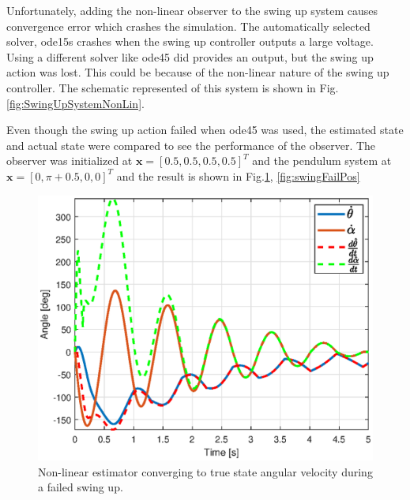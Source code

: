 \documentclass[superscriptaddress,floatfix,reprint,amssymb, amsmath,aps, pre]{revtex4-1}
\newcommand{\bx}{\textbf{x}}
\begin{document}
{{{            Unfortunately, adding the non-linear observer to the swing up system causes convergence error which crashes the simulation. The automatically selected solver, ode15s crashes when the swing up controller outputs a large voltage. Using a different solver like ode45 did provides an output, but the swing up action was lost. This could be because of the non-linear nature of the swing up controller. The schematic represented of this system is shown in Fig.\ref{fig:SwingUpSystemNonLin}.

            Even though the swing up action failed when ode45 was used, the estimated state and actual state were compared to see the performance of the observer. The observer was initialized at \(\bx = [0.5,0.5,0.5,0.5]^T\) and the pendulum system at \(\bx = [0,\pi + 0.5,0,0]^T\) and the result is shown in Fig.\ref{fig:SwingupfailVel}, \ref{fig:swingFailPos}

            \begin{figure}
                \includegraphics[width = \linewidth]{SwingupfailVel.eps}
                \caption{Non-linear estimator converging to true state angular velocity during a failed swing up.}
                \label{fig:SwingupfailVel}
            \end{figure}

}}}
\end{document}
